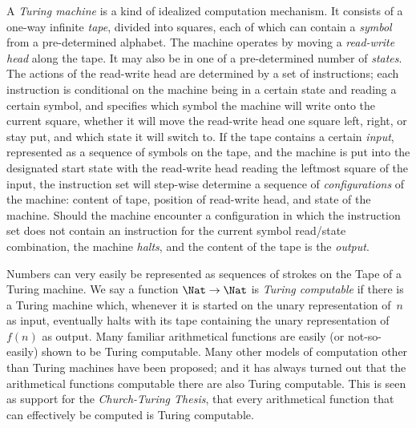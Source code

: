 A \emph{Turing machine} is a kind of idealized computation
mechanism. It consists of a one-way infinite \emph{tape}, divided into
squares, each of which can contain a \emph{symbol} from a
pre-determined alphabet. The machine operates by moving a
\emph{read-write head} along the tape. It may also be in one of a
pre-determined number of \emph{states}. The actions of the read-write
head are determined by a set of instructions; each instruction is
conditional on the machine being in a certain state and reading a
certain symbol, and specifies which symbol the machine will write onto
the current square, whether it will move the read-write head one
square left, right, or stay put, and which state it will switch to.
If the tape contains a certain \emph{input}, represented as a sequence
of symbols on the tape, and the machine is put into the designated
start state with the read-write head reading the leftmost square of
the input, the instruction set will step-wise determine a sequence of
\emph{configurations} of the machine: content of tape, position of
read-write head, and state of the machine.  Should the machine
encounter a configuration in which the instruction set does not
contain an instruction for the current symbol read/state combination,
the machine \emph{halts}, and the content of the tape is the
\emph{output}.

Numbers can very easily be represented as sequences of strokes on the
Tape of a Turing machine. We say a function $\Nat \to \Nat$ is
\emph{Turing computable} if there is a Turing machine which, whenever
it is started on the unary representation of~$n$ as input, eventually
halts with its tape containing the unary representation of~$f(n)$ as
output.  Many familiar arithmetical functions are easily (or
not-so-easily) shown to be Turing computable.  Many other models of
computation other than Turing machines have been proposed; and it has
always turned out that the arithmetical functions computable there are
also Turing computable. This is seen as support for the
\emph{Church-Turing Thesis}, that every arithmetical function that can
effectively be computed is Turing computable.

